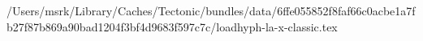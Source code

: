 /Users/msrk/Library/Caches/Tectonic/bundles/data/6ffe055852f8faf66c0acbe1a7fb27f87b869a90bad1204f3bf4d9683f597c7c/loadhyph-la-x-classic.tex